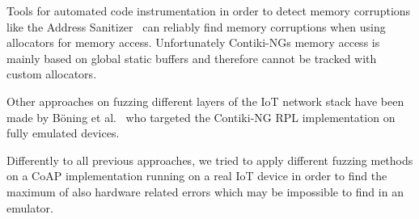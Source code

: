 Tools for automated code instrumentation in order to detect memory corruptions like the Address Sanitizer~\cite{addressSanitizer} can reliably find memory corruptions when using allocators for memory access. Unfortunately Contiki-NGs memory access is mainly based on global static buffers and therefore cannot be tracked with custom allocators.

Other approaches on fuzzing different layers of the IoT network stack have been made by Böning et al.~\cite{PawelLeo} who targeted the Contiki-NG RPL implementation on fully emulated devices.

Differently to all previous approaches, we tried to apply different fuzzing methods on a CoAP implementation running on a real IoT device in order to find the maximum of also hardware related errors which may be impossible to find in an emulator.
